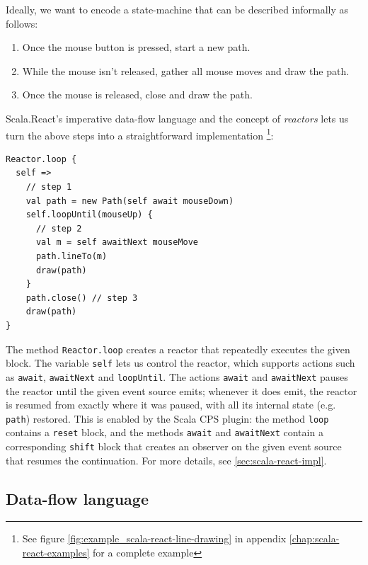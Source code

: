 Ideally, we want to encode a state-machine that can be described informally as follows:
\begin{enumerate}
\item Once the mouse button is pressed, start a new path.
\item While the mouse isn't released, gather all mouse moves and draw the path.
\item Once the mouse is released, close and draw the path.
\end{enumerate}

Scala.React's imperative data-flow language and the concept of \emph{reactors} lets us turn the above steps into a straightforward implementation \footnote{See figure \ref{fig:example_scala-react-line-drawing} in appendix \ref{chap:scala-react-examples} for a complete example}:

\begin{lstlisting}
Reactor.loop {
  self =>
    // step 1
    val path = new Path(self await mouseDown)
    self.loopUntil(mouseUp) {
      // step 2
      val m = self awaitNext mouseMove
      path.lineTo(m)
      draw(path)
    }
    path.close() // step 3
    draw(path)
}
\end{lstlisting}

The method \texttt{Reactor.loop} creates a reactor that repeatedly executes the given block. The variable \texttt{self} lets us control the reactor, which supports actions such as \texttt{await}, \texttt{awaitNext} and \texttt{loopUntil}. The actions \texttt{await} and \texttt{awaitNext} pauses the reactor until the given event source emits; whenever it does emit, the reactor is resumed from exactly where it was paused, with all its internal state (e.g. \texttt{path}) restored. This is enabled by the Scala CPS plugin: the method \texttt{loop} contains a \texttt{reset} block, and the methods \texttt{await} and \texttt{awaitNext} contain a corresponding \texttt{shift} block that creates an observer on the given event source that resumes the continuation. For more details, see \ref{sec:scala-react-impl}.

\subsection{Data-flow language}

